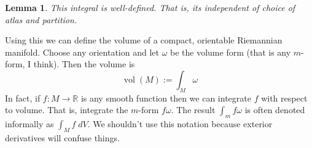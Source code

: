 \documentclass[11pt]{article}
\newcommand{\defeq}{:=}
\DeclareMathOperator{\vol}{\mathrm{vol}}
\newcommand{\R}{\mathbb{R}}
\newtheorem{lemma}[theorem]{Lemma}
\begin{document}
\begin{lemma}
This integral is well-defined.
That is, its independent of choice of atlas and partition.
\end{lemma}

Using this we can define the volume of a compact, orientable Riemannian manifold.
Choose any orientation and let $\omega$ be the volume form (that is any $m$-form, I think).
Then the volume is
\[
	\vol(M)\defeq\int_M \omega
\]
In fact, if $f:M \to \R$ is any smooth function then we can integrate $f$ with respect to volume.
That is, integrate the $m$-form $f\omega$.
The result $\int_m f\omega$ is often denoted informally as $\int_M f \; dV$.
We shouldn't use this notation because exterior derivatives will confuse things.
\end{document}
